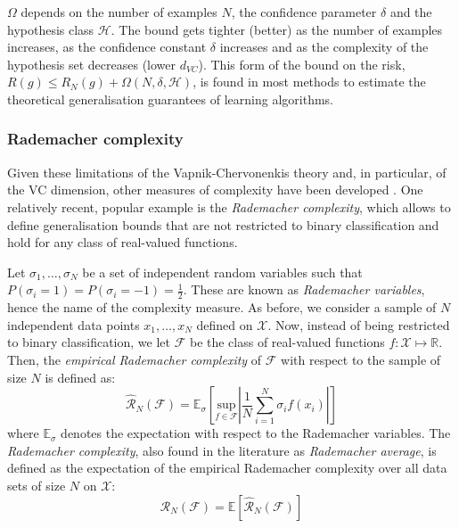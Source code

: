 {$\Omega$ depends on the number of examples $N$, the confidence parameter $\delta$ and the hypothesis class $\mathcal{H}$. The bound gets tighter (better) as the number of examples increases, as the confidence constant $\delta$ increases and as the complexity of the hypothesis set decreases (lower $d_{VC}$). This form of the bound on the risk, $R(g) \leq R_{N}(g) + \Omega(N, \delta, \mathcal{H})$, is found in most methods to estimate the theoretical generalisation guarantees of learning algorithms.

\subsubsection{Rademacher complexity}
\label{sec:background-rademacher}
Given these limitations of the Vapnik-Chervonenkis theory and, in particular, of the VC dimension, other measures of complexity have been developed \citep{bartlett2002complexity}. One relatively recent, popular example is the \textit{Rademacher complexity}, which allows to define generalisation bounds that are not restricted to binary classification and hold for any class of real-valued functions. 

Let $\sigma_1, \ldots, \sigma_N$ be a set of independent random variables such that $P(\sigma_i = 1) = P(\sigma_i = -1) = \frac{1}{2}$. These are known as \textit{Rademacher variables}, hence the name of the complexity measure. As before, we consider a sample of $N$ independent data points $x_1, \ldots, x_N$ defined on $\mathcal{X}$. Now, instead of being restricted to binary classification, we let $\mathcal{F}$ be the class of real-valued functions $f \colon \mathcal{X} \mapsto \mathbb{R}$. Then, the \textit{empirical Rademacher complexity} of $\mathcal{F}$ with respect to the sample of size $N$ is defined as:
%
\begin{equation}
\label{eq:background-empirical_rademacher_complexity}
  \hat{\mathcal{R}}_{N}(\mathcal{F}) = \mathbb{E}_{\sigma} \left[ \underset{f \in \mathcal{F}}{\mathrm{sup}} \left| \frac{1}{N} \sum_{i=1}^{N} \sigma_{i}f(x_{i}) \right| \right]
\end{equation}
%
where $\mathbb{E}_{\sigma}$ denotes the expectation with respect to the Rademacher variables. The \textit{Rademacher complexity}, also found in the literature as \textit{Rademacher average}, is defined as the expectation of the empirical Rademacher complexity over all data sets of size $N$ on $\mathcal{X}$:
\begin{equation}
\label{eq:background-rademacher_complexity}
  \mathcal{R}_{N}(\mathcal{F}) = \mathbb{E} \left[ \hat{\mathcal{R}}_{N}(\mathcal{F}) \right]
\end{equation}

}
